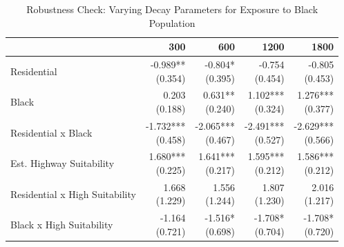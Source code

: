 \begin{table}[h]
\centering
\caption{Robustness Check: Varying Decay Parameters for Exposure to Black Population}
\label{tab:robustness/decay_parameter}
\begin{threeparttable}
\begin{tabular*}{1.0\textwidth}{@{\extracolsep{\fill}}l*{4}{r}}
\toprule
 & 300 & 600 & 1200 & 1800 \\
\midrule
Residential & \makecell[tr]{-0.989{**} \\ (0.354)} & \makecell[tr]{-0.804{*} \\ (0.395)} & \makecell[tr]{-0.754 \\ (0.454)} & \makecell[tr]{-0.805 \\ (0.453)} \\
Black & \makecell[tr]{0.203 \\ (0.188)} & \makecell[tr]{0.631{**} \\ (0.240)} & \makecell[tr]{1.102{***} \\ (0.324)} & \makecell[tr]{1.276{***} \\ (0.377)} \\
Residential x Black & \makecell[tr]{-1.732{***} \\ (0.458)} & \makecell[tr]{-2.065{***} \\ (0.467)} & \makecell[tr]{-2.491{***} \\ (0.527)} & \makecell[tr]{-2.629{***} \\ (0.566)} \\
Est. Highway Suitability & \makecell[tr]{1.680{***} \\ (0.225)} & \makecell[tr]{1.641{***} \\ (0.217)} & \makecell[tr]{1.595{***} \\ (0.212)} & \makecell[tr]{1.586{***} \\ (0.212)} \\
Residential x High Suitability & \makecell[tr]{1.668 \\ (1.229)} & \makecell[tr]{1.556 \\ (1.244)} & \makecell[tr]{1.807 \\ (1.230)} & \makecell[tr]{2.016 \\ (1.217)} \\
Black x High Suitability & \makecell[tr]{-1.164 \\ (0.721)} & \makecell[tr]{-1.516{*} \\ (0.698)} & \makecell[tr]{-1.708{*} \\ (0.704)} & \makecell[tr]{-1.708{*} \\ (0.720)} \\

\end{tabular*}
\end{threeparttable}
\end{table}
